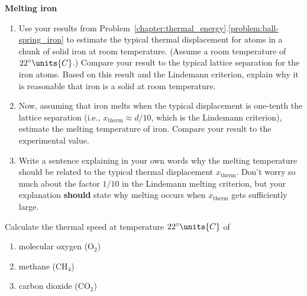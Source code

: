 \begin{problem} {\bf Melting iron}
  \begin{enumerate}
  \item Use your results from
    Problem~\ref{chapter:thermal_energy}.\ref{problem:ball-spring_iron}
    to estimate the typical thermal displacement for atoms in a chunk
    of solid iron at room temperature.  (Assume a room temperature of
    $22^{\circ}\units{C}$.)  Compare your result to the typical
    lattice separation for the iron atoms.  Based on this result and
    the Lindemann criterion, explain why it is reasonable that iron is
    a solid at room temperature.

  \item Now, assuming that iron melts when the typical displacement is
    one-tenth the lattice separation (i.e., $x_\text{therm} \approx
    d/10$, which is the Lindemann criterion), estimate the melting
    temperature of iron.  Compare your result to the experimental
    value.

  \item Write a sentence explaining in your own words why the melting
    temperature should be related to the typical thermal displacement
    $x_\text{therm}$.  Don't worry so much about the factor $1/10$ in
    the Lindemann melting criterion, but your explanation {\bf should}
    state why melting occurs when $x_\text{therm}$ gets sufficiently large.
  \end{enumerate}
\label{problem:iron_melting}
\end{problem}


\begin{problem}
Calculate the thermal speed at temperature $22^\circ\units{C}$ of
\begin{enumerate}
\item molecular oxygen (O$_2$)
\item methane (CH$_4$)
\item carbon dioxide (CO$_2$)
\end{enumerate}
\label{problem:thermal_speeds}
\end{problem}

